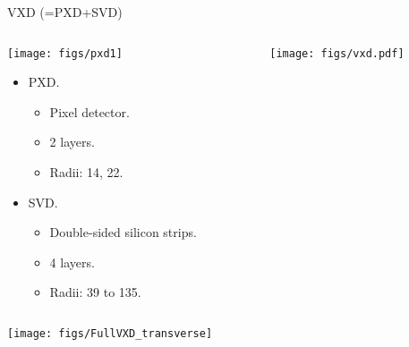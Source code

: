 \begin{frame}{VXD (=PXD+SVD)}
\begin{columns}
\begin{column}{0.5\linewidth}
\hspace{4.cm}\texttt{[image: figs/pxd1]}
\begin{itemize} \small
\vspace{-1.8cm}
\item PXD.
\vspace{0.05cm}
\begin{itemize}
\item Pixel detector. 
\vspace{0.05cm}
\item 2 layers.
\vspace{0.05cm}
\item Radii: 14, 22\mm.
\vspace{0.1cm}
\end{itemize}
\item SVD.
\vspace{0.05cm}
\begin{itemize}
\item Double-sided silicon strips.
\vspace{0.05cm}
\item 4 layers.
\vspace{0.05cm}
\item Radii: 39 to 135\mm.
\end{itemize}
\end{itemize}
\end{column}
\begin{column}{0.5\linewidth}
\texttt{[image: figs/vxd.pdf]}
\end{column}
\end{columns}
\texttt{[image: figs/FullVXD\_transverse]}
\end{frame}
